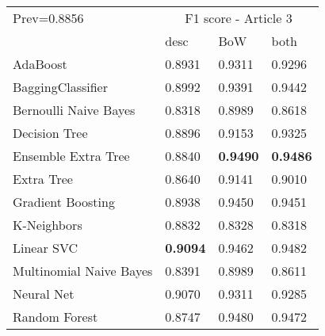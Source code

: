 \begin{tabular}{|l|l|l|l| }
\hline
Prev=0.8856 &  \multicolumn{3}{c|}{F1 score - Article 3} \\
\cline{2-4} & desc & BoW & both \\ \hline
AdaBoost                & 0.8931 & 0.9311 & 0.9296\\
BaggingClassifier       & 0.8992 & 0.9391 & 0.9442\\
Bernoulli Naive Bayes   & 0.8318 & 0.8989 & 0.8618\\
Decision Tree           & 0.8896 & 0.9153 & 0.9325\\
Ensemble Extra Tree     & 0.8840 & {\bf 0.9490} & {\bf 0.9486}\\
Extra Tree              & 0.8640 & 0.9141 & 0.9010\\
Gradient Boosting       & 0.8938 & 0.9450 & 0.9451\\
K-Neighbors             & 0.8832 & 0.8328 & 0.8318\\
Linear SVC              & {\bf 0.9094} & 0.9462 & 0.9482\\
Multinomial Naive Bayes & 0.8391 & 0.8989 & 0.8611\\
Neural Net              & 0.9070 & 0.9311 & 0.9285\\
Random Forest           & 0.8747 & 0.9480 & 0.9472\\
\hline
\end{tabular}